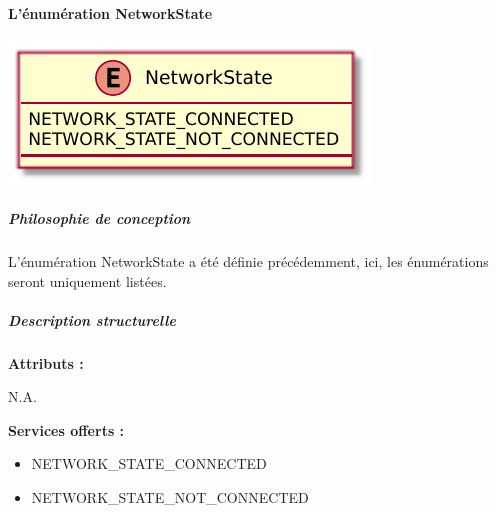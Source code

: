 \paragraph{L'énumération NetworkState}

\begin{minipage}
    {\linewidth}
    \centering
    \includegraphics[width=0.5\linewidth]{../schemas/Conception_detaillee/enum_NetworkState.pdf}
\end{minipage}

\subparagraph{Philosophie de conception \newline} 

\medspace

L'énumération NetworkState a été définie précédemment, ici, les énumérations seront uniquement listées. 

\subparagraph{Description structurelle \newline}

\medspace

\textbf{Attributs :}

N.A.

\textbf{Services offerts :}

\begin{itemize}
    \item NETWORK\_STATE\_CONNECTED
    \item NETWORK\_STATE\_NOT\_CONNECTED
\end{itemize}